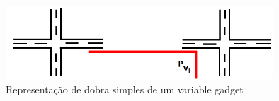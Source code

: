 \begin{figure}[htb]	
\center%
\includegraphics[width=10cm]{./img/gadgetVariavel.png}
\caption{Representação de dobra simples de um variable gadget}
\label{fig:gadgetVariavel}
\end{figure}